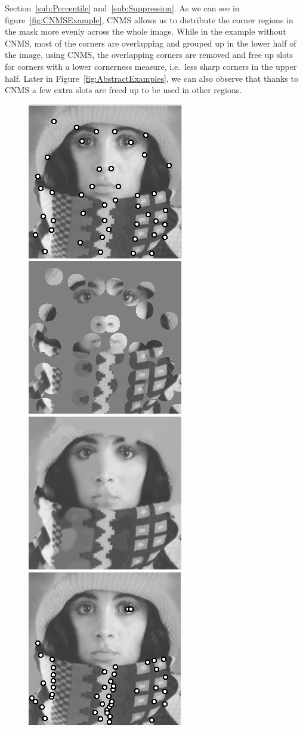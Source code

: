Section~\ref{sub:Percentile} and~\ref{sub:Suppression}. As we can see in
figure~\ref{fig:CNMSExample}, CNMS allows us to distribute the corner regions in the mask more
evenly across the whole image. While in the example without CNMS, most of the corners are
overlapping and grouped up in the lower half of the image, using CNMS, the overlapping corners are
removed and free up slots for corners with a lower cornerness measure, i.e.\ less sharp corners in
the upper half. Later in Figure~\ref{fig:AbstractExamples}, we can also observe that thanks to
CNMS a few extra slots are freed up to be used in other regions.\\
\begin{figure}
    \centering
    \includegraphics[width=0.31\linewidth]{../Images/trui/trui_corners_cnms.png}
    \includegraphics[width=0.31\linewidth]{../Images/trui/trui-mask_cnms.png}
    \includegraphics[width=0.31\linewidth]{../Images/trui/trui-inpaint_cnms.png}\\
    \vspace{0.2cm}
    \includegraphics[width=0.31\linewidth]{../Images/trui/trui_corners_non_cnms.png}

\end{figure}
